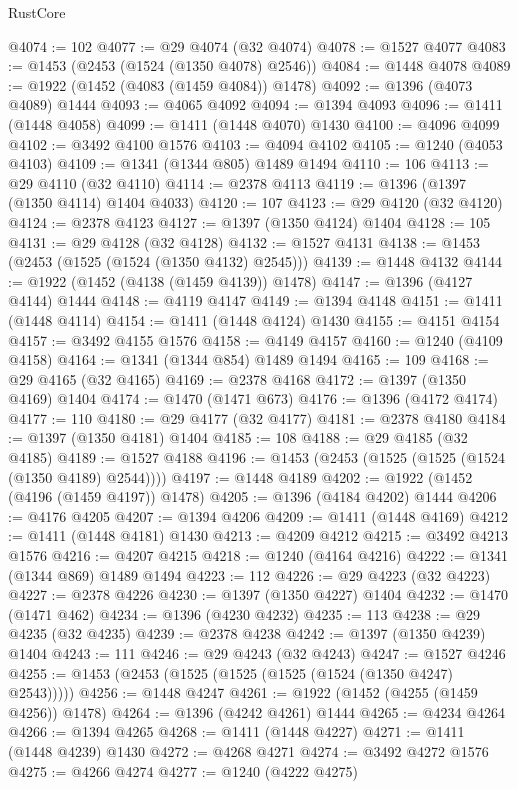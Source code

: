 \begin{lexlean}{RustCore}
\begin{coremodule}
@4074 := 102
@4077 := @29 @4074 (@32 @4074)
@4078 := @1527 @4077
@4083 := @1453 (@2453 (@1524 (@1350 @4078) @2546))
@4084 := @1448 @4078
@4089 := @1922 (@1452 (@4083 (@1459 @4084)) @1478)
@4092 := @1396 (@4073 @4089) @1444
@4093 := @4065 @4092
@4094 := @1394 @4093
@4096 := @1411 (@1448 @4058)
@4099 := @1411 (@1448 @4070) @1430
@4100 := @4096 @4099
@4102 := @3492 @4100 @1576
@4103 := @4094 @4102
@4105 := @1240 (@4053 @4103)
@4109 := @1341 (@1344 @805) @1489 @1494
@4110 := 106
@4113 := @29 @4110 (@32 @4110)
@4114 := @2378 @4113
@4119 := @1396 (@1397 (@1350 @4114) @1404 @4033)
@4120 := 107
@4123 := @29 @4120 (@32 @4120)
@4124 := @2378 @4123
@4127 := @1397 (@1350 @4124) @1404
@4128 := 105
@4131 := @29 @4128 (@32 @4128)
@4132 := @1527 @4131
@4138 := @1453 (@2453 (@1525 (@1524 (@1350 @4132) @2545)))
@4139 := @1448 @4132
@4144 := @1922 (@1452 (@4138 (@1459 @4139)) @1478)
@4147 := @1396 (@4127 @4144) @1444
@4148 := @4119 @4147
@4149 := @1394 @4148
@4151 := @1411 (@1448 @4114)
@4154 := @1411 (@1448 @4124) @1430
@4155 := @4151 @4154
@4157 := @3492 @4155 @1576
@4158 := @4149 @4157
@4160 := @1240 (@4109 @4158)
@4164 := @1341 (@1344 @854) @1489 @1494
@4165 := 109
@4168 := @29 @4165 (@32 @4165)
@4169 := @2378 @4168
@4172 := @1397 (@1350 @4169) @1404
@4174 := @1470 (@1471 @673)
@4176 := @1396 (@4172 @4174)
@4177 := 110
@4180 := @29 @4177 (@32 @4177)
@4181 := @2378 @4180
@4184 := @1397 (@1350 @4181) @1404
@4185 := 108
@4188 := @29 @4185 (@32 @4185)
@4189 := @1527 @4188
@4196 := @1453 (@2453 (@1525 (@1525 (@1524 (@1350 @4189) @2544))))
@4197 := @1448 @4189
@4202 := @1922 (@1452 (@4196 (@1459 @4197)) @1478)
@4205 := @1396 (@4184 @4202) @1444
@4206 := @4176 @4205
@4207 := @1394 @4206
@4209 := @1411 (@1448 @4169)
@4212 := @1411 (@1448 @4181) @1430
@4213 := @4209 @4212
@4215 := @3492 @4213 @1576
@4216 := @4207 @4215
@4218 := @1240 (@4164 @4216)
@4222 := @1341 (@1344 @869) @1489 @1494
@4223 := 112
@4226 := @29 @4223 (@32 @4223)
@4227 := @2378 @4226
@4230 := @1397 (@1350 @4227) @1404
@4232 := @1470 (@1471 @462)
@4234 := @1396 (@4230 @4232)
@4235 := 113
@4238 := @29 @4235 (@32 @4235)
@4239 := @2378 @4238
@4242 := @1397 (@1350 @4239) @1404
@4243 := 111
@4246 := @29 @4243 (@32 @4243)
@4247 := @1527 @4246
@4255 := @1453 (@2453 (@1525 (@1525 (@1525 (@1524 (@1350 @4247) @2543)))))
@4256 := @1448 @4247
@4261 := @1922 (@1452 (@4255 (@1459 @4256)) @1478)
@4264 := @1396 (@4242 @4261) @1444
@4265 := @4234 @4264
@4266 := @1394 @4265
@4268 := @1411 (@1448 @4227)
@4271 := @1411 (@1448 @4239) @1430
@4272 := @4268 @4271
@4274 := @3492 @4272 @1576
@4275 := @4266 @4274
@4277 := @1240 (@4222 @4275)

\end{coremodule}
\end{lexlean}
